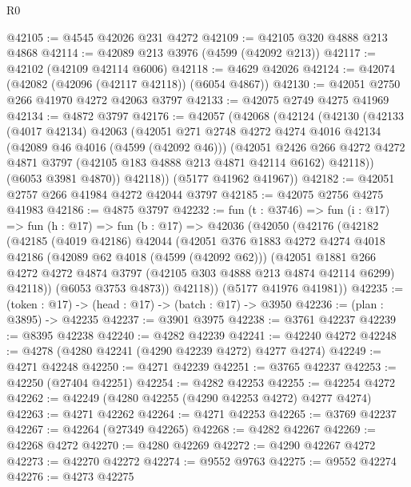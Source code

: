 \begin{lexlean}{R0}
\begin{coremodule}
@42105 := @4545 @42026 @231 @4272
@42109 := @42105 @320 @4888 @213 @4868
@42114 := @42089 @213 @3976 (@4599 (@42092 @213))
@42117 := @42102 (@42109 @42114 @6006)
@42118 := @4629 @42026
@42124 := @42074 (@42082 (@42096 (@42117 @42118)) (@6054 @4867))
@42130 := @42051 @2750 @266 @41970 @4272 @42063 @3797
@42133 := @42075 @2749 @4275 @41969
@42134 := @4872 @3797
@42176 := @42057
    (@42068
      (@42124
        (@42130
          (@42133
            (@4017 @42134)
            @42063
            (@42051
              @271
              @2748
              @4272
              @4274
              @4016
              @42134
              (@42089 @46 @4016 (@4599 (@42092 @46)))
              (@42051
                @2426
                @266
                @4272
                @4272
                @4871
                @3797
                (@42105 @183 @4888 @213 @4871 @42114 @6162)
                @42118))
            (@6053 @3981 @4870))
          @42118))
      (@5177 @41962 @41967))
@42182 := @42051 @2757 @266 @41984 @4272 @42044 @3797
@42185 := @42075 @2756 @4275 @41983
@42186 := @4875 @3797
@42232 := fun (t : @3746) =>
  fun (i : @17) =>
  fun (h : @17) =>
  fun (b : @17) =>
  @42036
    (@42050
      (@42176
        (@42182
          (@42185
            (@4019 @42186)
            @42044
            (@42051
              @376
              @1883
              @4272
              @4274
              @4018
              @42186
              (@42089 @62 @4018 (@4599 (@42092 @62)))
              (@42051
                @1881
                @266
                @4272
                @4272
                @4874
                @3797
                (@42105 @303 @4888 @213 @4874 @42114 @6299)
                @42118))
            (@6053 @3753 @4873))
          @42118))
      (@5177 @41976 @41981))
@42235 := (token : @17) -> (head : @17) -> (batch : @17) -> @3950
@42236 := (plan : @3895) -> @42235
@42237 := @3901 @3975
@42238 := @3761 @42237
@42239 := @8395 @42238
@42240 := @4282 @42239
@42241 := @42240 @4272
@42248 := @4278 (@4280 @42241 (@4290 @42239 @4272) @4277 @4274)
@42249 := @4271 @42248
@42250 := @4271 @42239
@42251 := @3765 @42237
@42253 := @42250 (@27404 @42251)
@42254 := @4282 @42253
@42255 := @42254 @4272
@42262 := @42249 (@4280 @42255 (@4290 @42253 @4272) @4277 @4274)
@42263 := @4271 @42262
@42264 := @4271 @42253
@42265 := @3769 @42237
@42267 := @42264 (@27349 @42265)
@42268 := @4282 @42267
@42269 := @42268 @4272
@42270 := @4280 @42269
@42272 := @4290 @42267 @4272
@42273 := @42270 @42272
@42274 := @9552 @9763
@42275 := @9552 @42274
@42276 := @4273 @42275

\end{coremodule}
\end{lexlean}

